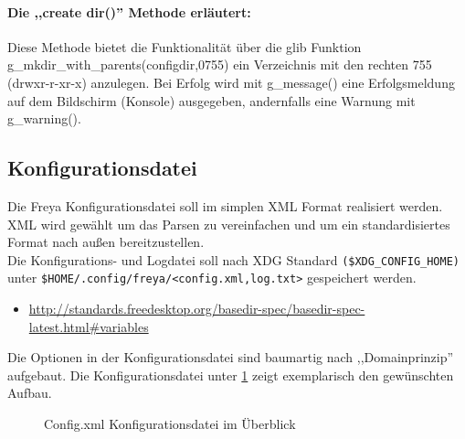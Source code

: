 \paragraph{Die ,,create dir()'' Methode erläutert:}
Diese Methode bietet die Funktionalität über die glib Funktion g\_mkdir\_with\_parents(configdir,0755) ein Verzeichnis mit den rechten 755 (drwxr-r-xr-x) anzulegen. Bei Erfolg wird mit g\_message() eine Erfolgsmeldung auf dem Bildschirm (Konsole)
ausgegeben, andernfalls eine Warnung mit g\_warning().



\subsection{Konfigurationsdatei}

Die Freya Konfigurationsdatei soll im simplen XML Format realisiert werden. XML wird gewählt um das Parsen zu vereinfachen und um
ein standardisiertes Format nach außen bereitzustellen. 
\\
Die Konfigurations- und Logdatei soll nach XDG Standard \verb+($XDG_CONFIG_HOME)+ unter \verb+$HOME/.config/freya/<config.xml,log.txt>+ gespeichert werden.

\begin{itemize}
    \item \url{http://standards.freedesktop.org/basedir-spec/basedir-spec-latest.html#variables}
\end{itemize}

Die Optionen in der Konfigurationsdatei sind baumartig nach ,,Domainprinzip'' aufgebaut. Die Konfigurationsdatei unter \ref{c_config}
zeigt exemplarisch den gewünschten Aufbau.
\begin{figure}[htb!]
    
    \caption{Config.xml Konfigurationsdatei im Überblick}
    \label{c_config}
\end{figure}


\newpage

